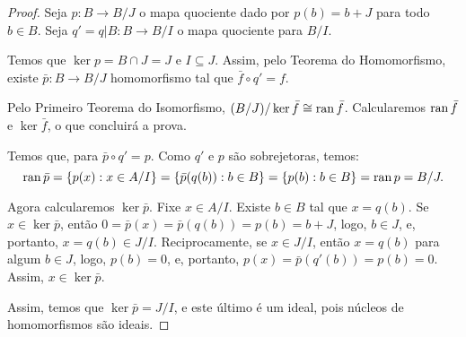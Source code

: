 \begin{proof}
    Seja $p:B\rightarrow B/J$ o mapa quociente dado por $p(b)=b+J$ para todo $b \in B$.
    Seja $q'=q|B:B\rightarrow B/I$ o mapa quociente para $B/I$.

    Temos que $\ker p=B\cap J=J$ e $I\subseteq J$.
    Assim, pelo Teorema do Homomorfismo, existe $\bar p:B\rightarrow B/J$ homomorfismo tal que $\bar f\circ q'=f$.
    \begin{figure}[H]\centering
    \end{figure}
    Pelo Primeiro Teorema do Isomorfismo, $(B/J)/\ker \bar f\cong \operatorname{ran} \bar f$.
    Calcularemos $\operatorname{ran} \bar f$ e $\ker \bar f$, o que concluirá a prova.

    Temos que, para $\bar p\circ q'=p$.
    Como $q'$ e $p$ são sobrejetoras, temos:
    \[\operatorname{ran} \bar p=\{p(x): x \in A/I\}=\{\bar p(q(b)):b \in B\}=\{p(b):b \in B\}=\operatorname{ran} p=B/J.\]

    Agora calcularemos $\ker \bar p$.
    Fixe $x \in A/I$.
    Existe $b \in B$ tal que $x=q(b)$.
    Se $x \in \ker \bar p$, então $0=\bar p(x)=\bar p(q(b))=p(b)=b+J$, logo, $b \in J$, e, portanto, $x=q(b)\in J/I$.
    Reciprocamente, se $x \in J/I$, então $x=q(b)$ para algum $b \in J$, logo, $p(b)=0$, e, portanto, $p(x)=\bar p(q'(b))=p(b)=0$.
    Assim, $x \in \ker \bar p$.

    Assim, temos que $\ker \bar p=J/I$, e este último é um ideal, pois núcleos de homomorfismos são ideais.
\end{proof}
